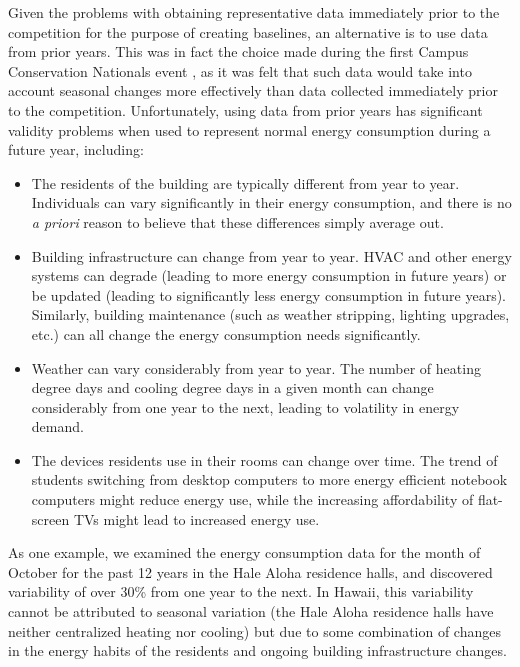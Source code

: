 \documentclass[jou]{apa} %
\begin{document}
Given the problems with obtaining representative data immediately prior to the competition
for the purpose of creating baselines, an alternative is to use data from prior years.
This was in fact the choice made during the first Campus Conservation Nationals event
\cite{Willens2010}, as it was felt that such data would take into account seasonal changes
more effectively than data collected immediately prior to the competition. Unfortunately,
using data from prior years has significant validity problems when used to represent
normal energy consumption during a future year, including:

\begin{itemize}

\item The residents of the building are typically different from year to year.
  Individuals can vary significantly in their energy consumption, and there is no {\em a
    priori} reason to believe that these differences simply average out. 

\item Building infrastructure can change from year to year. HVAC and other energy systems
  can degrade (leading to more energy consumption in future years) or be updated (leading
  to significantly less energy consumption in future years).  Similarly, building
  maintenance (such as weather stripping, lighting upgrades, etc.) can all change the
  energy consumption needs significantly.

\item Weather can vary considerably from year to year.  The number of heating degree days and cooling
  degree days in a given month can change considerably from one year to the next, leading
  to volatility in energy demand. 

\item The devices residents use in their rooms can change over time. The trend of
students switching from desktop computers to more energy efficient notebook computers
might reduce energy use, while the increasing affordability of flat-screen TVs might
lead to increased energy use.

\end{itemize}

As one example, we examined the energy consumption data for the month of October for the
past 12 years in the Hale Aloha residence halls, and discovered variability of over 30\%
from one year to the next. In Hawaii, this variability cannot be attributed to seasonal
variation (the Hale Aloha residence halls have neither centralized heating nor cooling)
but due to some combination of changes in the energy habits of the residents and ongoing
building infrastructure changes.
\end{document}
